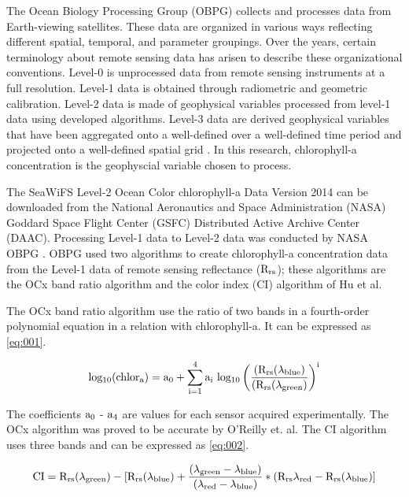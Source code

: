 The Ocean Biology Processing Group (OBPG) collects and processes data from Earth-viewing satellites. These data are organized in various ways reflecting different spatial, temporal, and parameter groupings. Over the years, certain terminology about remote sensing data has arisen to describe these organizational conventions. Level-0 is unprocessed data from remote sensing instruments at a full resolution. Level-1 data is obtained through radiometric and geometric calibration. Level-2 data is made of geophysical variables processed from level-1 data using developed algorithms. Level-3 data are derived geophysical variables that have been aggregated onto a well-defined over a well-defined time period and projected onto a well-defined spatial grid \cite{feldman2017ocean}. In this research, chlorophyll-a concentration is the geophyscial variable chosen to process.

The SeaWiFS Level-2 Ocean Color chlorophyll-a Data Version 2014 can be downloaded from the National Aeronautics and Space Administration (NASA) Goddard Space Flight Center (GSFC) Distributed Active Archive Center (DAAC). Processing Level-1 data to Level-2 data was conducted by NASA OBPG \cite{NASASeaFiWSdata}. OBPG used two algorithms to create chlorophyll-a concentration data from the Level-1 data of remote sensing reflectance ($\rm R_{rs}$); these algorithms are the OCx band ratio algorithm and the color index (CI) algorithm of Hu et al\cite{hu2012chlorophyll}. 

The OCx band ratio algorithm use the ratio of two bands in a fourth-order polynomial equation in a relation with chlorophyll-a. It can be expressed as \eqref{eq:001}.
 
 \begin{equation}
 {\rm log_{10} (chlor_a) = a_0 + \sum_{i=1}^4 a_i ~ log_{10} \left( \frac{(R_{rs}(\lambda_{blue})}{(R_{rs}(\lambda_{green})} \right) ^i }
 \label{eq:001}
 \end{equation}
 
The coefficients $\rm a_0$ - $\rm a_4$ are values for each sensor acquired experimentally. The OCx algorithm was proved to be accurate by O’Reilly et. al\cite{o2000ocean}. The CI algorithm uses three bands and can be expressed as \eqref{eq:002}.

 \begin{equation}
{\rm CI = R_{rs} ({\lambda}_{green}) - [R_{rs} ({\lambda}_{blue}) + \frac {({\lambda}_{green} - {\lambda}_{blue})} {({\lambda}_{red} - {\lambda}_{blue})} * (R_{rs}{\lambda}_{red} - R_{rs} ({\lambda}_{blue}) ]}
\label{eq:002}
\end{equation}

